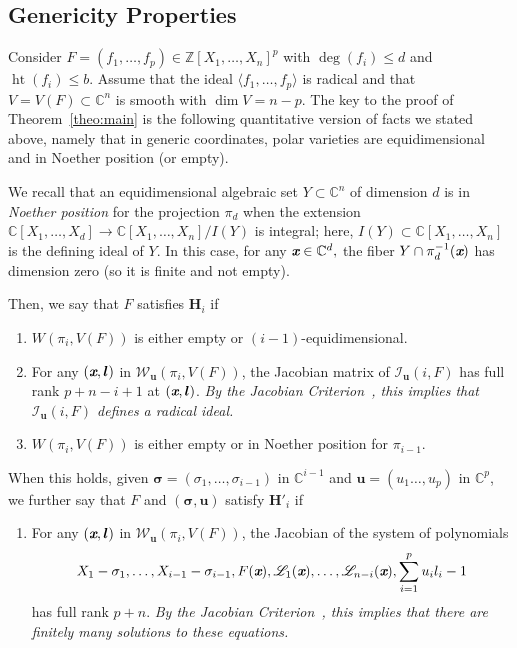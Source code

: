 \documentclass[a4paper]{article}
\def\ub{{\bm u}}
\def\lb{{\bm l}}
\def\xb{\textit{\textbf{x}}}
\DeclareMathOperator{\htt}{ht}
\newcommand{\ZZ}{{\mathbb{Z}}}
\def\C{\mathbb{C}}
\def\Iil{\mathscr{I}_{\ub}(i,F)}
\begin{document}

\subsection{Genericity Properties}\label{sec:gen}
Consider $F= (f_1,\hdots,f_p) \in \ZZ[X_1,\hdots,X_n]^p$ with $\deg(f_i) \leq d$ and $\htt(f_i) \leq b$. Assume that the ideal $\langle f_1,\hdots, f_p \rangle $ is radical and that $V=V(F) \subset \C^n$ is smooth with $\dim V = n-p$. The key
to the proof of Theorem~\ref{theo:main} is the following quantitative
version of facts we stated above, namely that in generic coordinates,
polar varieties are  equidimensional and in Noether position
(or empty).


We recall that an equidimensional algebraic set $Y \subset \C^n$ of
dimension $d$ is in \textit{Noether position} for the projection
$\pi_d$ when the extension $\C[X_1,\hdots,X_{d}] \rightarrow
\C[X_1,\hdots,X_n]/I(Y)$ is integral; here, $I(Y) \subset
\C[X_1,\hdots,X_n]$ is the defining ideal of $Y$. In this case, for any $\xb \in \C^d,$ the fiber $Y \cap \pi_d^{-1}(\xb)$ has dimension zero (so it is finite and not empty).


Then, we say that $F$ satisfies $\textbf{H}_i$ if
\begin{enumerate}
\item  $W(\pi_i,V(F))$ is either empty or $(i-1)$-equidimensional.
\item For any $(\xb,\lb)$ in $\mathscr{W}_{\ub}(\pi_i,V(F))$, the Jacobian matrix of $\Iil$ has full rank $p+n-i+1$ at $(\xb,\lb)$. {\em By the Jacobian Criterion~\cite[Corollary 16.20]{ECA}, this
  implies that $\Iil$ defines a radical ideal.}
\item $W(\pi_i,V(F))$ is either empty or in Noether position for
  $\pi_{i-1}$.
\smallskip
\end{enumerate}
When this holds, given $\bm \sigma = (\sigma_1,\hdots,\sigma_{i-1})$ 
in $\C^{i-1}$ and $\ub=(u_1\hdots,u_p)$ in $\C^p$, we further say that $F$ and $(\bm \sigma,\ub)$ satisfy
$\textbf{H}'_i$ if
\begin{enumerate}
\item For any $(\xb,\lb)$ in $\mathscr{W}_{\ub}(\pi_i,V(F))$, the Jacobian of the system of polynomials  
\[
 X_1-\sigma_1,\dots,X_{i-1}-\sigma_{i-1},F(\xb), \mathscr{L}_1(\xb), \hdots, \mathscr{L}_{n-i}(\xb),\sum_{i=1}^pu_il_i-1
\]
has full rank $p+n$. {\em By the Jacobian Criterion~\cite[Corollary 16.20]{ECA}, this implies that there are finitely many solutions to these equations.}
\end{enumerate}
\end{document}
